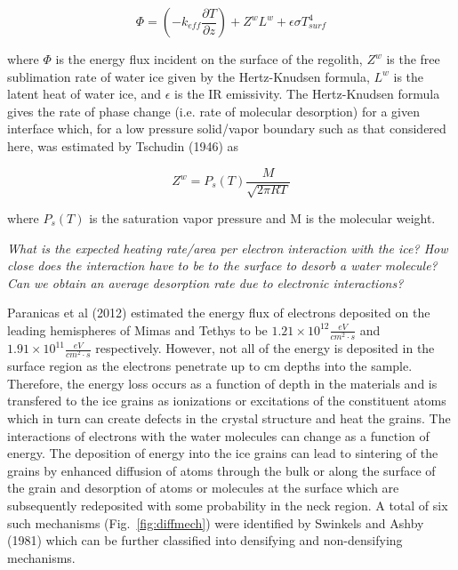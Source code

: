 \documentclass[11pt]{article} %
\begin{document}
	\begin{equation}
	\Phi = \left( - k_{eff} \frac{\partial T}{\partial z} \right) + Z^{w}L^{w} +\epsilon \sigma T_{surf}^{4}
	\end{equation}
	
	where $\Phi$ is the energy flux incident on the surface of the regolith, $Z^{w}$ is the free sublimation rate of water ice given by the Hertz-Knudsen formula, $L^{w}$ is the latent heat of water ice, and $\epsilon$ is the IR emissivity. The Hertz-Knudsen formula gives the rate of phase change (i.e. rate of molecular desorption) for a given interface which, for a low pressure solid/vapor boundary such as that considered here, was estimated by Tschudin (1946) as
	
	\begin{equation}
	Z^{w} = P_{s}(T)\frac{M}{\sqrt{2\pi R T}}
	\end{equation}
	
	where $P_{s}(T)$ is the saturation vapor pressure and M is the molecular weight.
	
	\emph{What is the expected heating rate/area per electron interaction with the ice? How close does the interaction have to be to the surface to desorb a water molecule? Can we obtain an average desorption rate due to electronic interactions?}

	Paranicas et al (2012) estimated the energy flux of electrons deposited on the leading hemispheres of Mimas and Tethys to be $1.21\times 10^{12} \frac{eV}{cm^{2}\cdot s}$ and $1.91\times 10^{11} \frac{eV}{cm^{2}\cdot s}$ respectively. However, not all of the energy is deposited in the surface region as the electrons penetrate up to cm depths into the sample. Therefore, the energy loss occurs as a function of depth in the materials and is transfered to the ice grains as ionizations or excitations of the constituent atoms which in turn can create defects in the crystal structure and heat the grains. The interactions of electrons with the water molecules can change as a function of energy. The deposition of energy into the ice grains can lead to sintering of the grains by enhanced diffusion of atoms through the bulk or along the surface of the grain and desorption of atoms or molecules at the surface which are subsequently redeposited with some probability in the neck region. A total of six such mechanisms (Fig.~\ref{fig:diffmech}) were identified by Swinkels and Ashby (1981) which can be further classified into densifying and non-densifying mechanisms.
	
\end{document}
